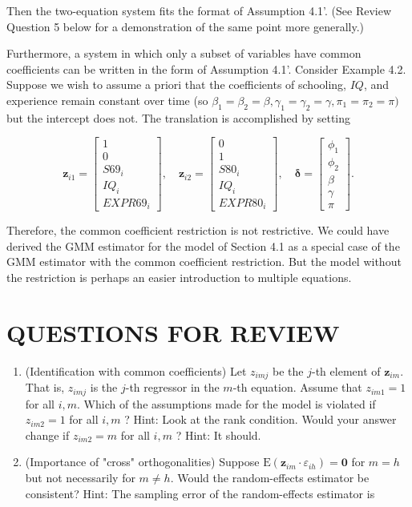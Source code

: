 \documentclass[10pt]{article}
\begin{document}
Then the two-equation system fits the format of Assumption 4.1'. (See Review Question 5 below for a demonstration of the same point more generally.)

Furthermore, a system in which only a subset of variables have common coefficients can be written in the form of Assumption 4.1'. Consider Example 4.2. Suppose we wish to assume a priori that the coefficients of schooling, $I Q$, and experience remain constant over time (so $\beta_{1}=\beta_{2}=\beta, \gamma_{1}=\gamma_{2}=\gamma, \pi_{1}=\pi_{2}= \pi)$ but the intercept does not. The translation is accomplished by setting

\[
\mathbf{z}_{i 1}=\left[\begin{array}{c}
1  \tag{4.6.19}\\
0 \\
S 69_{i} \\
I Q_{i} \\
E X P R 69_{i}
\end{array}\right], \quad \mathbf{z}_{i 2}=\left[\begin{array}{c}
0 \\
1 \\
S 80_{i} \\
I Q_{i} \\
E X P R 80_{i}
\end{array}\right], \quad \boldsymbol{\delta}=\left[\begin{array}{c}
\phi_{1} \\
\phi_{2} \\
\beta \\
\gamma \\
\pi
\end{array}\right] .
\]

Therefore, the common coefficient restriction is not restrictive. We could have derived the GMM estimator for the model of Section 4.1 as a special case of the GMM estimator with the common coefficient restriction. But the model without the restriction is perhaps an easier introduction to multiple equations.

\section*{QUESTIONS FOR REVIEW}
\begin{enumerate}
  \item (Identification with common coefficients) Let $z_{i m j}$ be the $j$-th element of $\mathbf{z}_{i m}$. That is, $z_{i m j}$ is the $j$-th regressor in the $m$-th equation. Assume that $z_{i m 1}=1$ for all $i, m$. Which of the assumptions made for the model is violated if $z_{i m 2}=1$ for all $i, m$ ? Hint: Look at the rank condition. Would your answer change if $z_{i m 2}=m$ for all $i, m$ ? Hint: It should.
  \item (Importance of "cross" orthogonalities) Suppose $\mathrm{E}\left(\mathbf{z}_{i m} \cdot \varepsilon_{i h}\right)=\mathbf{0}$ for $m=h$ but not necessarily for $m \neq h$. Would the random-effects estimator be consistent? Hint: The sampling error of the random-effects estimator is
\end{enumerate}
\end{document}
